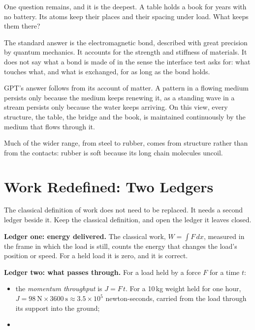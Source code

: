 \documentclass[11pt,a4paper]{article}
\begin{document}
One question remains, and it is the deepest. A table holds a book for years with no battery. Its atoms keep their places and their spacing under load. What keeps them there?

The standard answer is the electromagnetic bond, described with great precision by quantum mechanics. It accounts for the strength and stiffness of materials. It does not say what a bond is made of in the sense the interface test asks for: what touches what, and what is exchanged, for as long as the bond holds.

GPT's answer follows from its account of matter.  A pattern in a flowing medium persists only because the medium keeps renewing it, as a standing wave in a stream persists only because the water keeps arriving. On this view, every structure, the table, the bridge and the book, is maintained continuously by the medium that flows through it. 

 Much of the wider range, from steel to rubber, comes from structure rather than from the contacts: rubber is soft because its long chain molecules uncoil.

\section{Work Redefined: Two Ledgers}

The classical definition of work does not need to be replaced. It needs a second ledger beside it. Keep the classical definition, and open the ledger it leaves closed.

\textbf{Ledger one: energy delivered.} The classical work, $W=\int F\,dx$, measured in the frame in which the load is still, counts the energy that changes the load's position or speed. For a held load it is zero, and it is correct.

\textbf{Ledger two: what passes through.} For a load held by a force $F$ for a time $t$:
\begin{itemize}
\item the \emph{momentum throughput} is $J = F\,t$. For a 10\,kg weight held for one hour, $J = 98\ \text{N}\times3600\ \text{s} \approx 3.5\times10^{5}$ newton-seconds, carried from the load through its support into the ground;
\item {}
\end{itemize}
\end{document}
